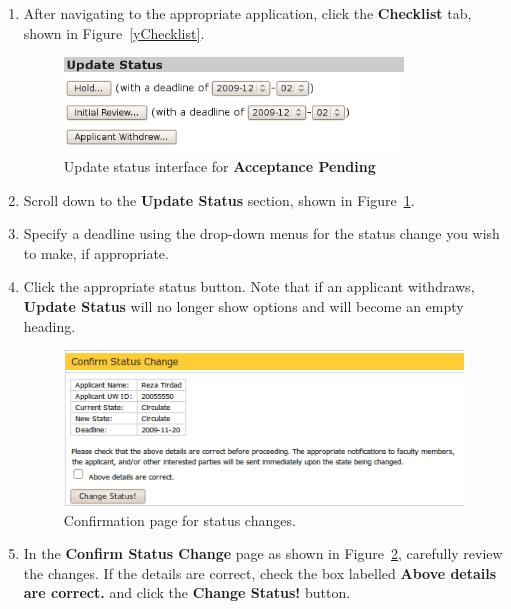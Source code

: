 \documentclass[titlepage]{article}
\begin{document}
\begin{enumerate}
\item After navigating to the appropriate application, click the
  \textbf{\textsf{Checklist}} tab, shown in Figure~\ref{yChecklist}.

\begin{figure}[h!]
  \begin{center}
  \includegraphics[width=9cm]{updatestatus.png}
  \end{center}
  \caption{Update status interface for \textbf{\textsf{Acceptance Pending}}}
  \label{yUpdate}
\end{figure}

\item Scroll down to the \textbf{\textsf{Update Status}} section, shown in
  Figure~\ref{yUpdate}.
\item Specify a deadline using the drop-down menus for the status change you
  wish to make, if appropriate.
\item Click the appropriate status button. Note that if an applicant withdraws,
  \textbf{\textsf{Update Status}} will no longer show options and will become
  an empty heading.

\begin{figure}[h!]
  \begin{center}
  \includegraphics[width=13cm]{updatestatus_confirm.png}
  \end{center}
  \caption{Confirmation page for status changes.}
  \label{yUpdateConfirm}
\end{figure}

\item In the \textbf{\textsf{Confirm Status Change}} page as shown in
  Figure~\ref{yUpdateConfirm}, carefully review the changes. If the
  details are correct, check the box labelled \textbf{\textsf{Above details are
  correct.}} and click the \textbf{\textsf{Change Status!}} button.
\end{enumerate}
\end{document}

